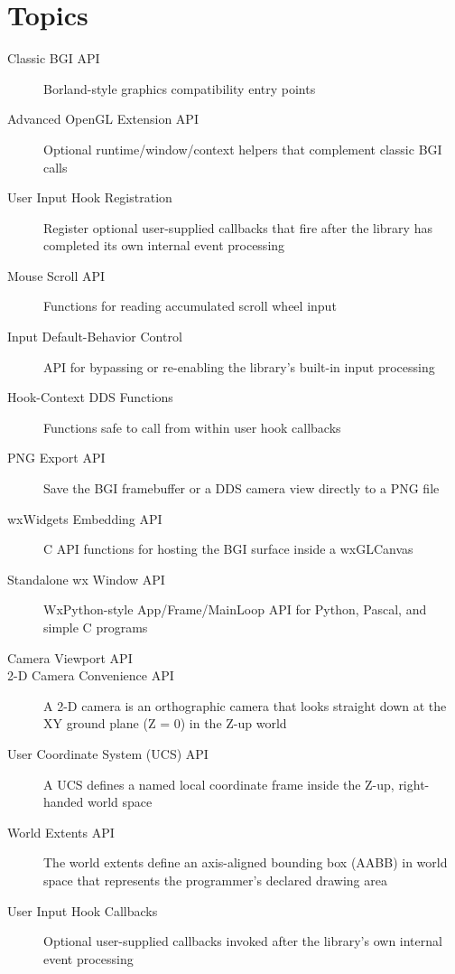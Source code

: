 \section*{Topics}

\begin{description}
  \item[Classic BGI API] Borland-style graphics compatibility entry points
  \item[Advanced OpenGL Extension API] Optional runtime/window/context helpers that complement classic BGI calls
  \item[User Input Hook Registration] Register optional user-supplied callbacks that fire after the library has completed its own internal event processing
  \item[Mouse Scroll API] Functions for reading accumulated scroll wheel input
  \item[Input Default-Behavior Control] API for bypassing or re-enabling the library's built-in input processing
  \item[Hook-Context DDS Functions] Functions safe to call from within user hook callbacks
  \item[PNG Export API] Save the BGI framebuffer or a DDS camera view directly to a PNG file
  \item[wxWidgets Embedding API] C API functions for hosting the BGI surface inside a wxGLCanvas
  \item[Standalone wx Window API] WxPython-style App/Frame/MainLoop API for Python, Pascal, and simple C programs
  \item[Camera Viewport API] 
  \item[2-D Camera Convenience API] A 2-D camera is an orthographic camera that looks straight down at the XY ground plane (Z = 0) in the Z-up world
  \item[User Coordinate System (UCS) API] A UCS defines a named local coordinate frame inside the Z-up, right-handed world space
  \item[World Extents API] The world extents define an axis-aligned bounding box (AABB) in world space that represents the programmer's declared drawing area
  \item[User Input Hook Callbacks] Optional user-supplied callbacks invoked after the library's own internal event processing
\end{description}
